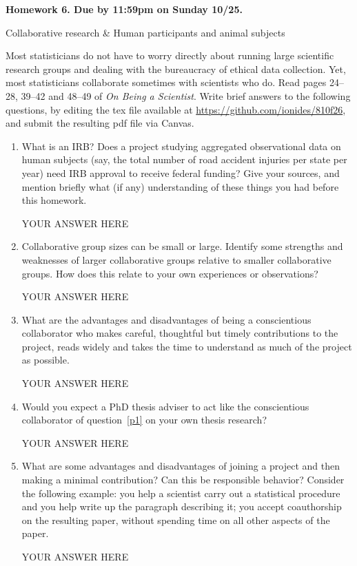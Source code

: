 \documentclass[12pt]{article}
\begin{document}
\begin{center}\bf
Homework 6. Due by 11:59pm on Sunday 10/25.

Collaborative research \& Human participants and animal subjects

\end{center}
Most statisticians do not have to worry directly about running large scientific research groups and dealing with the bureaucracy of ethical data collection. Yet, most statisticians collaborate sometimes with scientists who do. Read pages 24--28, 39--42 and 48--49 of {\em On Being a Scientist}.  Write brief answers to the following questions, by editing the tex file available at \url{https://github.com/ionides/810f26}, and submit the resulting pdf file via Canvas.

\begin{enumerate}

\item What is an IRB? Does a project studying aggregated observational data on human subjects (say, the total number of road accident injuries per state per year) need IRB approval to receive federal funding? Give your sources, and mention briefly what (if any) understanding of these things you had before this homework.

YOUR ANSWER HERE

\item Collaborative group sizes can be small or large. Identify some strengths and weaknesses of larger collaborative groups relative to smaller collaborative groups. How does this relate to your own experiences or observations?

YOUR ANSWER HERE
 
\item \label{p1} What are the advantages and disadvantages of being a conscientious collaborator who makes careful, thoughtful but timely contributions to the project, reads widely and takes the time to understand as much of the project as possible.

YOUR ANSWER HERE

\item Would you expect a PhD thesis adviser to act like the conscientious collaborator of question~\ref{p1} on your own thesis research? 

YOUR ANSWER HERE

\item What are some advantages and disadvantages of joining a project and then making a minimal contribution? Can this be responsible behavior? Consider the following example: you help a scientist carry out a statistical procedure and you help write up the paragraph describing it; you accept coauthorship on the resulting paper, without spending time on all other aspects of the paper.

YOUR ANSWER HERE

\end{enumerate}
\end{document}
